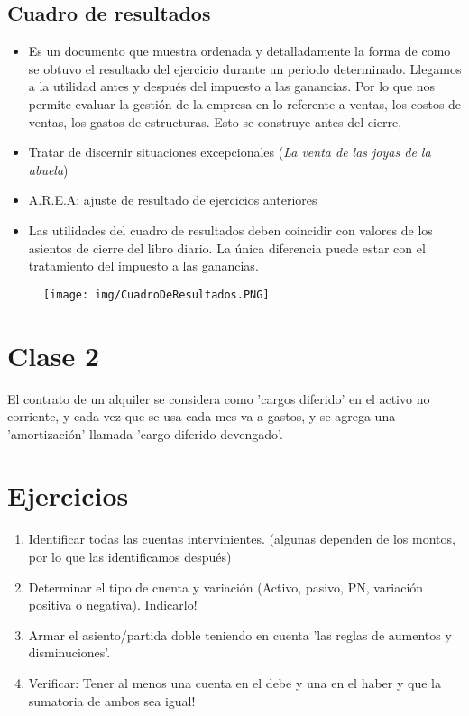 \documentclass[titlepage,a4paper]{article}
\begin{document}
\subsection{Cuadro de resultados}
\begin{itemize}
\item Es un documento que muestra ordenada y detalladamente la forma de como se obtuvo el resultado del ejercicio durante un periodo determinado. Llegamos a la utilidad antes y después del impuesto a las ganancias. Por lo que nos permite evaluar la gestión de la empresa en lo referente a ventas, los costos de ventas, los gastos de estructuras. Esto se construye antes del cierre,
\item Tratar de discernir situaciones excepcionales (\textit{La venta de las joyas de la abuela})
\item A.R.E.A: ajuste de resultado de ejercicios anteriores
\item Las utilidades del cuadro de resultados deben coincidir con valores de los asientos de cierre del libro diario. La única diferencia puede estar con el tratamiento del impuesto a las ganancias.
\end{itemize}

\begin{figure}[!htb]
    \centering
    \texttt{[image: img/CuadroDeResultados.PNG]}
\end{figure}

\section*{Clase 2}

El contrato de un alquiler se considera como 'cargos diferido' en el activo no corriente, y cada vez que se usa cada mes va a gastos, y se agrega una 'amortización' llamada 'cargo diferido devengado'.


\section*{Ejercicios}
\begin{enumerate}
\item Identificar todas las cuentas intervinientes. (algunas dependen de los montos, por lo que las identificamos después)
\item Determinar el tipo de cuenta y variación (Activo, pasivo, PN, variación positiva o negativa). Indicarlo!
\item Armar el asiento/partida doble teniendo en cuenta 'las reglas de aumentos y disminuciones'.
\item Verificar: Tener al menos una cuenta en el debe y una en el haber y que la sumatoria de ambos sea igual!
\end{enumerate}
\end{document}
